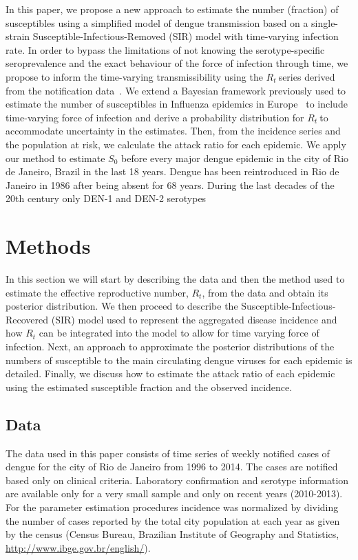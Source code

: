 \documentclass[10pt]{article}
\def \rr {$R_{t}\:$}
\begin{document}
In this paper, we propose a new approach to estimate the number (fraction) of 
susceptibles using a simplified model of dengue transmission based on a 
single-strain Susceptible-Infectious-Removed (SIR) model with time-varying 
infection rate.
In order to bypass the limitations of not knowing the serotype-specific 
seroprevalence and the exact behaviour of the force of infection through time, 
we
propose to inform the time-varying transmissibility using the \rr series 
derived from the notification data~\citep{nishiura}.
We extend a Bayesian framework previously used to estimate the number 
of susceptibles in Influenza epidemics in Europe~\citep{pone2011} to include 
time-varying force of infection and derive a probability distribution  for 
\rr to accommodate uncertainty in the estimates. 
Then, from the incidence series and the population at risk, we  calculate the 
attack ratio for each epidemic.
We apply our method to estimate $S_0$ before every major dengue epidemic in the 
city of Rio de Janeiro, Brazil in the last 18 years. Dengue has been 
reintroduced in Rio de Janeiro in 1986 after being absent for 68 
years\citep{nogueira1999dengue}. During the last decades of the 20th century 
only DEN-1 and DEN-2 serotypes

\section*{Methods}

In this section we will start by describing the data and then the method used 
to estimate the effective reproductive number, $R_t$, from the data and obtain 
its posterior distribution. 
We then proceed to describe the Susceptible-Infectious-Recovered (SIR) model 
used to represent the aggregated disease incidence and how $R_t$ can be 
integrated into the model to allow for time varying force of infection. 
Next, an approach to approximate the posterior distributions 
of the numbers of susceptible to the main circulating dengue viruses for each 
epidemic is detailed.
Finally, we discuss how to estimate the attack ratio of each 
epidemic using the estimated susceptible fraction and the observed incidence.

\subsection*{Data} 

The data used in this paper consists of time 
series of weekly notified cases of dengue for the 
city of Rio de Janeiro from 1996 to 2014. The cases are notified 
based only on clinical criteria.
Laboratory confirmation and serotype 
information are available only for a very small sample and only on recent 
years (2010-2013).
For the parameter estimation  procedures incidence was normalized by dividing 
the number of cases reported by the total city population at each year as given 
by the census (Census Bureau, Brazilian Institute of Geography and Statistics, 
\url{http://www.ibge.gov.br/english/}).
\end{document}
